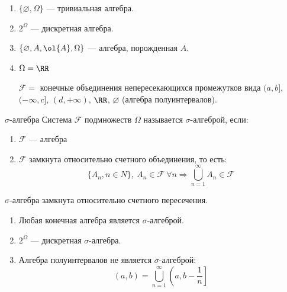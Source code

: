 \begin{example}{}{}
    \begin{enumerate}
        \item
            \( \{ \varnothing, \Omega \} \) --- тривиальная алгебра.
        \item
            \( 2^{\Omega} \) --- дискретная алгебра.
        \item
            \( \{ \varnothing, A, \ol{A}, \Omega \} \) --- алгебра,
            порожденная \( A \).
        \item
            \( \Omega = \RR \)

            \( \mathcal{F} = \) конечные объединения непересекающихся промежутков вида \( (a, b] \),
            \( (-\infty, c] \), \( (d, +\infty) \), \( \RR \), \( \varnothing \)
            (алгебра полуинтервалов).
    \end{enumerate}
\end{example}

\begin{defn}{\( \sigma \)-алгебра}{}
    Система \( \mathcal{F} \) подмножеств \( \Omega \)
    называется \( \sigma \)-алгеброй,
    если:
    \begin{enumerate}
        \item
            \( \mathcal{F} \) --- алгебра
        \item
            \( \mathcal{F} \) замкнута относительно счетного объединения, то есть:
            \[
                \{ A_n, n \in N \}, \ A_n \in \mathcal{F} \ \forall n
                \Rightarrow 
                \bigcup\limits_{n = 1}^{\infty} A_n \in \mathcal{F}
            \]
    \end{enumerate}
\end{defn}

\begin{exercise}{}{}
    \( \sigma \)-алгебра замкнута относительно счетного пересечения.
\end{exercise}

\begin{example}{}{}
    \begin{enumerate}
        \item
            Любая конечная алгебра является \( \sigma \)-алгеброй.
        \item
            \( 2^{\Omega} \) --- дискретная \( \sigma \)-алгебра.
        \item
            Алгебра полуинтервалов не является \( \sigma \)-алгеброй:
            \[
                (a, b) = \bigcup\limits_{n = 1}^{\infty} \left( a, b - \frac{1}{n} \right]
            \]
    \end{enumerate}
\end{example}

